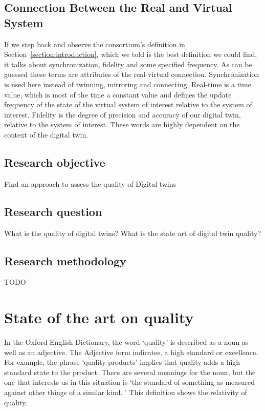 \documentclass[9pt,conference]{IEEEtran}
\begin{document}
    \subsection*{Connection Between the Real and Virtual System}
    If we step back and observe the consortium's definition in Section~\ref{section:introduction}, which we told is the best definition we could find, 
    it talks about synchronization, fidelity and some specified frequency. As can be guessed these terms are attributes of the real-virtual connection.
    Synchronization is used here instead of twinning, mirroring and connecting. 
    Real-time is a time value, which is most of the time a constant value and defines the update frequency of the state of the virtual system of interest relative to the system of interest.
    Fidelity is the degree of precision and accuracy of our digital twin, relative to the system of interest.
    These words are highly dependent on the context of the digital twin.
    \subsection{Research objective}
    Find an approach to assess the quality of Digital twins~\cite{Jones2020}

    \subsection{Research question}\label{section: Research Questions}
    What is the quality of digital twins?
    What is the state art of digital twin quality?

    \subsection{Research methodology}
    TODO

    \section{State of the art on quality}
    In the Oxford English Dictionary, the word `quality' is described as a noun as well as an adjective. The Adjective form indicates, a high standard or excellence. 
    For example, the phrase `quality products' implies that quality adds a high standard state to the product. 
    There are several meanings for the noun, but the one that interests us in this situation is `the standard of something as measured against other things of a similar kind. \cite{OxfordDictionary}'
    This definition shows the relativity of quality.
\end{document}
